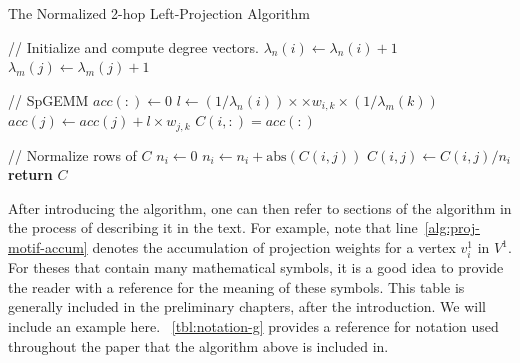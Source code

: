 \begin{algorithm}[!htb]
\caption{The Normalized 2-hop Left-Projection Algorithm}\label{alg:proj-motif}
\small
\begin{algorithmic}[1]
\item[] \quad\; // Initialize and compute degree vectors.
 
\State $\lambda_n(i) \gets \lambda_n(i) + 1$
\State $\lambda_m(j) \gets \lambda_m(j) + 1$
\EndFor
\item[] \quad\; // SpGEMM
 \label{alg:proj-motif-spgemm1}
\State $acc(:) \gets 0$ 
\State $l \gets  (1/\lambda_n(i)) \times \times w_{i,k} \times (1/\lambda_m(k))$ \label{alg:proj-motif-lk}
 
\State $acc(j) \gets acc(j) + l \times w_{j,k}$ \label{alg:proj-motif-accum}
\EndIf
\EndFor
\EndFor
\State $C(i,:) = acc(:)$
\EndFor\label{alg:proj-motif-spgemm2}
\item[] \quad\; // Normalize rows of $C$
\label{alg:proj-motif-norm1}
\State $n_i \gets 0$
\State $n_i \gets n_i + \text{abs}(C(i,j))$
\EndFor
{}
\State $C(i,j) \gets C(i,j) / n_i$
\EndFor
\EndFor\label{alg:proj-motif-norm2}
\State \textbf{return} $C$
\EndProcedure
\end{algorithmic}
\end{algorithm}

After introducing the algorithm, one can then refer to sections of the algorithm in the process of describing it in the text. For example, note that line~\ref{alg:proj-motif-accum} denotes the accumulation of projection weights for a vertex $v_i^1$ in $V^1$. For theses that contain many mathematical symbols, it is a good idea to provide the reader with a reference for the meaning of these symbols. This table is generally included in the preliminary chapters, after the introduction. We will include an example here. \tablename~\ref{tbl:notation-g} provides a reference for notation used throughout the paper that the algorithm above is included in.

